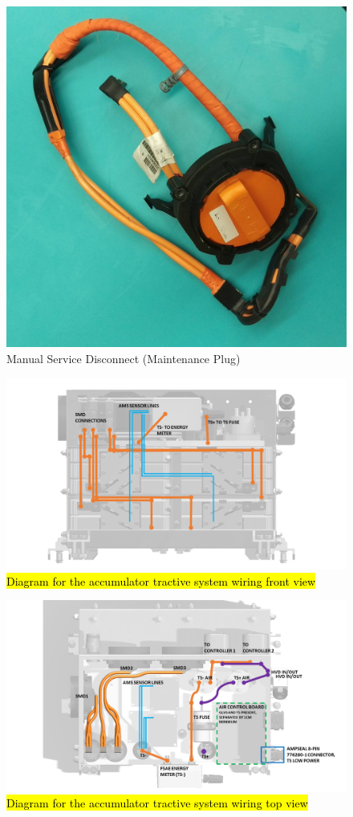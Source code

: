 \documentclass{article}
\DeclareRobustCommand{\hlr}[1]{{\sethlcolor{red}\hl{#1}}}
\begin{document}
            \begin{figure}[H]
                \centering
                \includegraphics[width = 0.5 \textwidth]{msd_highres}
                \caption{Manual Service Disconnect (Maintenance Plug)}
                \label{msd03}
            \end{figure}

            \begin{figure}[H]
                \centering
                \includegraphics[width = 0.5 \textwidth]{TRACTIVE_DIAGRAM_2}
                \caption{\hlr{Diagram for the accumulator tractive system wiring front view}}
                \label{tswiring_front}
            \end{figure}

            \begin{figure}[H]
                \centering
                \includegraphics[width = 0.5 \textwidth]{TRACTIVE_DIAGRAM_3}
                \caption{\hlr{Diagram for the accumulator tractive system wiring top view }}
                \label{tswiring_top}
            \end{figure}
\end{document}
